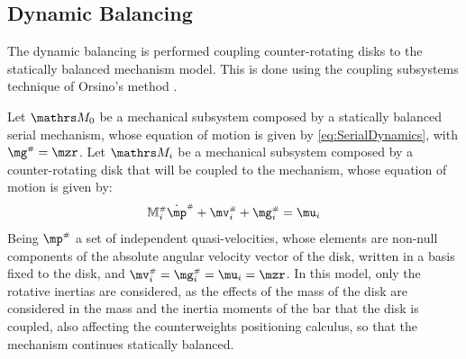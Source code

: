 \documentclass[a4paper,11pt,brazil,fleqn]{article}
\begin{document}
\subsection{Dynamic Balancing}\label{S02-3}

The dynamic balancing is performed coupling counter-rotating disks to the statically balanced mechanism model. This is done using the coupling subsystems technique of Orsino's method \cite{21orsino}.

Let $\ssM_0$ be a mechanical subsystem composed by a statically balanced serial mechanism, whose equation of motion is given by \eqref{eq:SerialDynamics}, with $\mg\ssh = \mzr$. Let $\ssM_i$ be a mechanical subsystem composed by a counter-rotating disk that will be coupled to the mechanism, whose equation of motion is given by:
\begin{equation}\label{eq:DiscDynamics}
\mM\ssh_i \dot{\mp}\ssh + \mv\ssh_i + \mg\ssh_i = \mu_i
\end{equation}
Being $\mp\ssh$ a set of independent quasi-velocities, whose elements are non-null components of the absolute angular velocity vector of the disk, written in a basis fixed to the disk, and $\mv\ssh_i = \mg\ssh_i = \mu_i = \mzr$. In this model, only the rotative inertias are considered, as the effects of the mass of the disk are considered in the mass and the inertia moments of the bar that the disk is coupled, also affecting the counterweights positioning calculus, so that the mechanism continues statically balanced.
\end{document}
